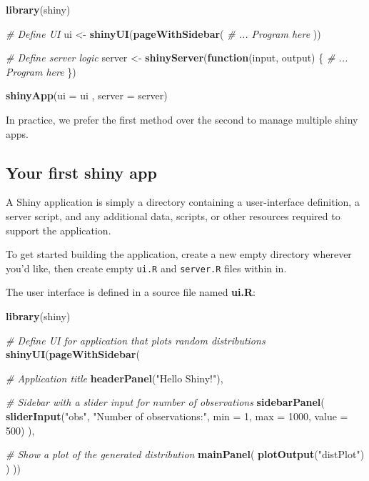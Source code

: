 \documentclass[]{book}
\newenvironment{Shaded}{\begin{snugshade}}{\end{snugshade}}
\newcommand{\KeywordTok}[1]{\textcolor[rgb]{0.13,0.29,0.53}{\textbf{#1}}}
\newcommand{\DataTypeTok}[1]{\textcolor[rgb]{0.13,0.29,0.53}{#1}}
\newcommand{\DecValTok}[1]{\textcolor[rgb]{0.00,0.00,0.81}{#1}}
\newcommand{\StringTok}[1]{\textcolor[rgb]{0.31,0.60,0.02}{#1}}
\newcommand{\CommentTok}[1]{\textcolor[rgb]{0.56,0.35,0.01}{\textit{#1}}}
\newcommand{\ControlFlowTok}[1]{\textcolor[rgb]{0.13,0.29,0.53}{\textbf{#1}}}
\newcommand{\NormalTok}[1]{#1}
\begin{document}
\begin{Shaded}
\begin{Highlighting}[]
\KeywordTok{library}\NormalTok{(shiny)}

\CommentTok{# Define UI }
\NormalTok{ui <-}\StringTok{ }\KeywordTok{shinyUI}\NormalTok{(}\KeywordTok{pageWithSidebar}\NormalTok{(}
      \CommentTok{# ... Program here}
\NormalTok{  ))}

\CommentTok{# Define server logic}
\NormalTok{server <-}\StringTok{ }\KeywordTok{shinyServer}\NormalTok{(}\ControlFlowTok{function}\NormalTok{(input, output) \{}
     \CommentTok{# ... Program here}
\NormalTok{\})}

\KeywordTok{shinyApp}\NormalTok{(}\DataTypeTok{ui =}\NormalTok{ ui , }\DataTypeTok{server =}\NormalTok{ server)}
\end{Highlighting}
\end{Shaded}

In practice, we prefer the first method over the second to manage
multiple shiny apps.

\subsection{Your first shiny app}\label{your-first-shiny-app}

A Shiny application is simply a directory containing a user-interface
definition, a server script, and any additional data, scripts, or other
resources required to support the application.

To get started building the application, create a new empty directory
wherever you'd like, then create empty \texttt{ui.R} and
\texttt{server.R} files within in.

The user interface is defined in a source file named \textbf{ui.R}:

\begin{Shaded}
\begin{Highlighting}[]
\KeywordTok{library}\NormalTok{(shiny)}

\CommentTok{# Define UI for application that plots random distributions }
\KeywordTok{shinyUI}\NormalTok{(}\KeywordTok{pageWithSidebar}\NormalTok{(}

  \CommentTok{# Application title}
  \KeywordTok{headerPanel}\NormalTok{(}\StringTok{"Hello Shiny!"}\NormalTok{),}

  \CommentTok{# Sidebar with a slider input for number of observations}
  \KeywordTok{sidebarPanel}\NormalTok{(}
    \KeywordTok{sliderInput}\NormalTok{(}\StringTok{"obs"}\NormalTok{, }
                \StringTok{"Number of observations:"}\NormalTok{, }
                \DataTypeTok{min =} \DecValTok{1}\NormalTok{,}
                \DataTypeTok{max =} \DecValTok{1000}\NormalTok{, }
                \DataTypeTok{value =} \DecValTok{500}\NormalTok{)}
\NormalTok{  ),}

  \CommentTok{# Show a plot of the generated distribution}
  \KeywordTok{mainPanel}\NormalTok{(}
    \KeywordTok{plotOutput}\NormalTok{(}\StringTok{"distPlot"}\NormalTok{)}
\NormalTok{  )}
\NormalTok{))}
\end{Highlighting}
\end{Shaded}
\end{document}
